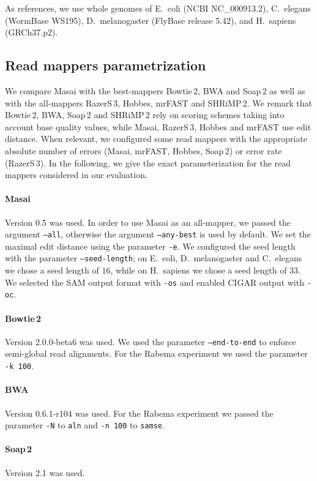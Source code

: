 As references, we use whole genomes of E.~coli (NCBI NC\_000913.2), C.~elegans (WormBase WS195), D.~melanogaster (FlyBase release 5.42), and H.~sapiens (GRCh37.p2).

\subsection{Read mappers parametrization}

We compare Masai with the best-mappers Bowtie\,2, BWA and Soap\,2 as well as with the all-mappers RazerS\,3, Hobbes, mrFAST and SHRiMP\,2.
We remark that Bowtie\,2, BWA, Soap\,2 and SHRiMP\,2 rely on scoring schemes taking into account base quality values, while Masai, RazerS\,3, Hobbes and mrFAST use edit distance.
When relevant, we configured some read mappers with the appropriate absolute number of errors (Masai, mrFAST, Hobbes, Soap\,2) or error rate (RazerS\,3).
In the following, we give the exact parameterization for the read mappers considered in our evaluation.

\paragraph{Masai}
Version 0.5 was used.
In order to use Masai as an all-mapper, we passed the argument \texttt{--all}, otherwise the argument \texttt{--any-best} is used by default.
We set the maximal edit distance using the parameter \texttt{-e}.
We configured the seed length with the parameter \texttt{--seed-length}; on E.~coli, D.~melanogaster and C.~elegans we chose a seed length of $16$, while on H.~sapiens we chose a seed length of $33$.
We selected the SAM output format with \texttt{-os} and enabled CIGAR output with \texttt{-oc}.

\paragraph{Bowtie\,2}
Version 2.0.0-beta6 was used.
We used the parameter \texttt{--end-to-end} to enforce semi-global read alignments.
For the Rabema experiment we used the parameter \texttt{-k 100}.

\paragraph{BWA}
Version 0.6.1-r104 was used.
For the Rabema experiment we passed the parameter \texttt{-N} to \texttt{aln} and \texttt{-n 100} to \texttt{samse}.

\paragraph{Soap\,2}
Version 2.1 was used.

